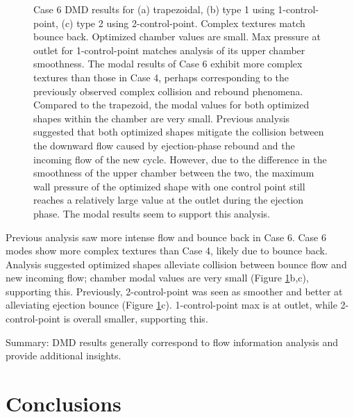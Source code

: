 \documentclass{article}
\begin{document}
\begin{figure}[htbp]
    \captionsetup{font=scriptsize}
    \caption{
    Case 6 DMD results for (a) trapezoidal, (b) type 1 using 1-control-point, (c) type 2 using 2-control-point.
    Complex textures match bounce back. Optimized chamber values are small.
    Max pressure at outlet for 1-control-point matches analysis of its upper chamber smoothness.
    The modal results of Case 6 exhibit more complex textures than those in Case 4, perhaps corresponding to the previously observed complex collision and rebound phenomena.
    Compared to the trapezoid, the modal values for both optimized shapes within the chamber are very small.
    Previous analysis suggested that both optimized shapes mitigate the collision between the downward flow caused by ejection-phase rebound and the incoming flow of the new cycle.
    However, due to the difference in the smoothness of the upper chamber between the two, the maximum wall pressure of the optimized shape with one control point still reaches a relatively large value at the outlet during the ejection phase.
    The modal results seem to support this analysis.
    }
    \label{fig:dynamic_mode_decomposition_case_6}
\end{figure}

Previous analysis saw more intense flow and bounce back in Case 6.
Case 6 modes show more complex textures than Case 4, likely due to bounce back.
Analysis suggested optimized shapes alleviate collision between bounce flow and new incoming flow;
chamber modal values are very small (Figure \ref{fig:dynamic_mode_decomposition_case_6}b,c), supporting this.
Previously, 2-control-point was seen as smoother and better at alleviating ejection bounce (Figure \ref{fig:dynamic_mode_decomposition_case_6}c).
1-control-point max is at outlet, while 2-control-point is overall smaller, supporting this.

Summary: DMD results generally correspond to flow information analysis and provide additional insights.

\section*{Conclusions}
\addtocounter{section}{1}
\setcounter{subsection}{0}
\indent
\end{document}
